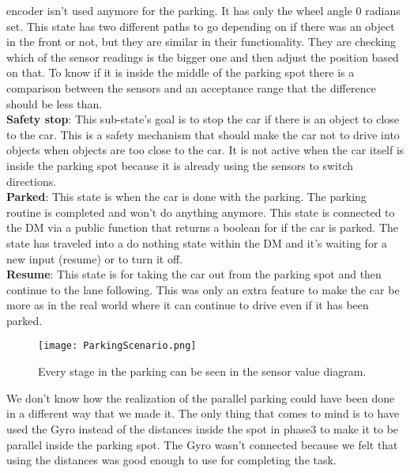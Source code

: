 encoder isn't used anymore for the parking. It has only the wheel angle 0
radians set. This state has two different paths to go depending on if there was
an object in the front or not, but they are similar in their functionality. They
are checking which of the sensor readings is the bigger one and then adjust the
position based on that. To know if it is inside the middle of the parking spot
there is a comparison between the sensors and an acceptance range that the
difference should be less than.\\
\textbf{Safety stop}: This sub-state's goal is to stop the car if there is an
object to close to the car. This is a safety mechanism that should make the car
not to drive into objects when objects are too close to the car. It is not
active when the car itself is inside the parking spot because it is already
using the sensors to switch directions.\\

\noindent
\textbf{Parked}: This state is when the car is done with the parking. The
parking routine is completed and won't do anything anymore. This state is
connected to the DM via a public function that returns a boolean for if the car
is parked. The state has traveled into a do nothing state within the DM and it's
waiting for a new input (resume) or to turn it off.\\

\noindent
\textbf{Resume}: This state is for taking the car out from the parking spot and
then continue to the lane following. This was only an extra feature to make the
car be more as in the real world where it can continue to drive even if it has
been parked.
\begin{figure}[ht]
  \centering
  \texttt{[image: ParkingScenario.png]}
  \caption{Every stage in the parking can be seen in the sensor value diagram.}
  \label{otfsmb}
\end{figure}
We don't know how the realization of the parallel parking could have been done
in a different way that we made it. The only thing that comes to mind is to have
used the Gyro instead of the distances inside the spot in phase3 to make it to
be parallel inside the parking spot. The Gyro wasn't connected because we felt
that using the distances was good enough to use for completing the task.